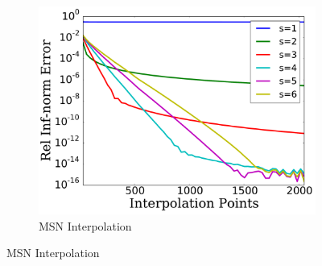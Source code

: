 
\begin{figure}[p]
    \centering
    \begin{subfigure}{0.45\textwidth}
    \includegraphics[width=\textwidth]{plots/msn_birkhoff_rough_sharp_funcs.pdf}
    \caption{MSN Interpolation}
    \end{subfigure}


\end{figure}

